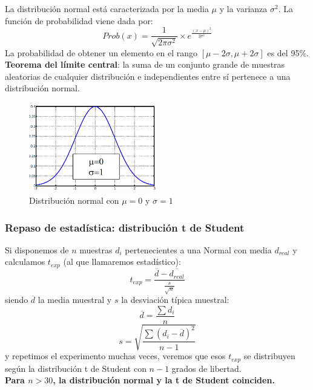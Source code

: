 \documentclass[12pt,spanish]{article}
\begin{document}
La distribución normal está caracterizada por la media $\mu$ y la varianza $\sigma^2$. La función de probabilidad viene dada por:
\begin{equation*}
	Prob(x) = \frac{1}{\sqrt{2\pi\sigma^2}}\times e^{\frac{(x-\mu)^2}{2\sigma^2}}
\end{equation*}
La probabilidad de obtener un elemento en el rango $[\mu - 2\sigma, \mu + 2\sigma]$ es del 95\%.\\
\textbf{Teorema del límite central}: la suma de un conjunto grande de muestras aleatorias de cualquier distribución e independientes entre sí pertenece a una distribución normal.
\begin{figure}[H]
	\centering
	\includegraphics[width=0.5\textwidth]{normal.png}
	\caption{Distribución normal con $\mu=0$ y $\sigma=1$}
\end{figure}

\subsubsection{Repaso de estadística: distribución t de Student}

Si disponemos de $n$ muestras $d_i$ pertenecientes a una Normal con media $d_{real}$ y calculamos $t_{exp}$ (al que llamaremos estadístico):
\begin{equation*}
	t_{exp}=\frac{\overline{d}-\overline{d_{real}}}{\frac{s}{\sqrt{n}}}
\end{equation*}
siendo $\overline{d}$ la media muestral y $s$ la desviación típica muestral:
\begin{equation*}
	\overline{d}=\frac{\sum{d_i}}{n}
\end{equation*}
\begin{equation*}
	s=\sqrt{\frac{\sum{(d_i-\overline{d})^2}}{n-1}}
\end{equation*}
y repetimos el experimento muchas veces, veremos que esos $t_{exp}$ se distribuyen según la distribución t de Student con $n-1$ grados de libertad.\\
\textbf{Para $n>30$, la distribución normal y la t de Student coinciden.}
\end{document}
